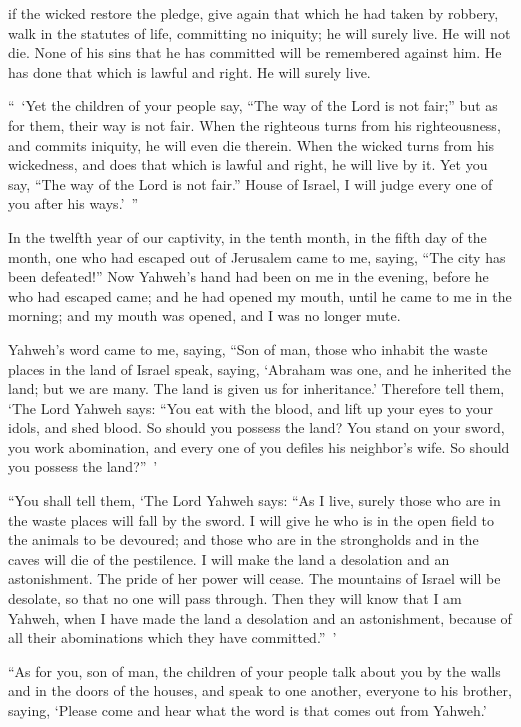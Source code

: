 {if the wicked restore the pledge, give again that which he had taken by robbery, walk in the statutes of life, committing no iniquity; he will surely live. He will not die.
None of his sins that he has committed will be remembered against him. He has done that which is lawful and right. He will surely live.
\par }{\PP {}“ ‘Yet the children of your people say, “The way of the Lord is not fair;” but as for them, their way is not fair.
When the righteous turns from his righteousness, and commits iniquity, he will even die therein.
When the wicked turns from his wickedness, and does that which is lawful and right, he will live by it.
Yet you say, “The way of the Lord is not fair.” House of Israel, I will judge every one of you after his ways.’ ”
\par }{\BB \par }{\PP {}In the twelfth year of our captivity, in the tenth month, in the fifth day of the month, one who had escaped out of Jerusalem came to me, saying, “The city has been defeated!”
Now Yahweh’s hand had been on me in the evening, before he who had escaped came; and he had opened my mouth, until he came to me in the morning; and my mouth was opened, and I was no longer mute.
\par }{\PP {}Yahweh’s word came to me, saying,
“Son of man, those who inhabit the waste places in the land of Israel speak, saying, ‘Abraham was one, and he inherited the land; but we are many. The land is given us for inheritance.’
Therefore tell them, ‘The Lord Yahweh says: “You eat with the blood, and lift up your eyes to your idols, and shed blood. So should you possess the land?
You stand on your sword, you work abomination, and every one of you defiles his neighbor’s wife. So should you possess the land?” ’
\par }{\PP {}“You shall tell them, ‘The Lord Yahweh says: “As I live, surely those who are in the waste places will fall by the sword. I will give he who is in the open field to the animals to be devoured; and those who are in the strongholds and in the caves will die of the pestilence.
I will make the land a desolation and an astonishment. The pride of her power will cease. The mountains of Israel will be desolate, so that no one will pass through.
Then they will know that I am Yahweh, when I have made the land a desolation and an astonishment, because of all their abominations which they have committed.” ’
\par }{\PP {}“As for you, son of man, the children of your people talk about you by the walls and in the doors of the houses, and speak to one another, everyone to his brother, saying, ‘Please come and hear what the word is that comes out from Yahweh.’
}
